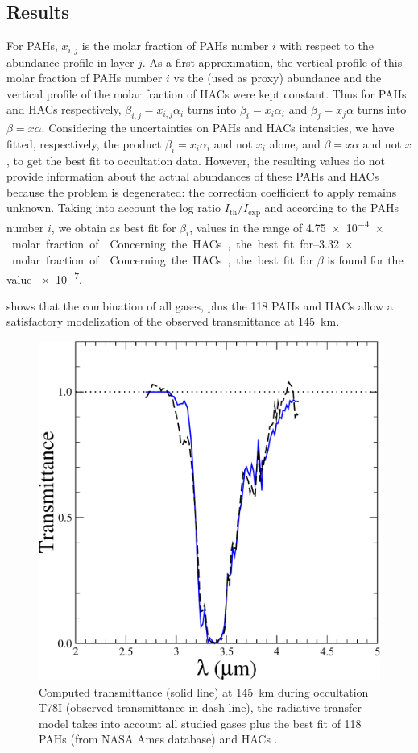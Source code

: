 \documentclass{arxiv-icarus}
\begin{document}
\subsection{Results}

For PAHs, $x_{i,j}$ is the molar fraction of PAHs number $i$ with respect to the  abundance profile in layer $j$.
As a first approximation, the vertical profile of this molar fraction of PAHs number $i$ vs the  (used as proxy) abundance and the vertical profile of the molar fraction of HACs were kept constant.
Thus for PAHs and HACs respectively, $\beta_{i,j}=x_{i,j} \alpha_i$ turns into $\beta_i = x_i \alpha_i$ and $\beta_j = x_j \alpha$ turns into $\beta = x \alpha$.
Considering the uncertainties on PAHs and HACs intensities, we have fitted, respectively, the product $\beta_i = x_i \alpha_i$ and not $x_i$ alone, and $\beta = x \alpha$ and not $x$, to get the best fit to occultation data.
However, the resulting values do not provide information about the actual abundances of these PAHs and HACs
because the problem is degenerated: the correction coefficient to apply remains unknown. Taking into account the log ratio $I_\text{th} / I_\text{exp}$ and according to the PAHs number $i$, we obtain as best fit for $\beta_i$, values in the range of \SIrange{4.75e-4}{3.32}{$\times$} molar fraction of .
Concerning the HACs, the best fit for $\beta$ is found for the value \num{e-7}.

 shows that the combination of all gases, plus the 118 PAHs and HACs allow a satisfactory modelization of the observed transmittance at \SI{145}{km}.


\begin{figure}[!ht]
    \includegraphics[width=.8\linewidth]{Fig_9}
    \caption{Computed transmittance (solid line) at \SI{145}{km} during occultation T78I (observed transmittance in dash line), the radiative transfer model takes into account all studied gases plus the best fit of 118 PAHs (from NASA Ames database) and HACs \citep[from][]{Dartois2007}.}
    \label{fig:gasesPAHHAC}
\end{figure}
\end{document}
